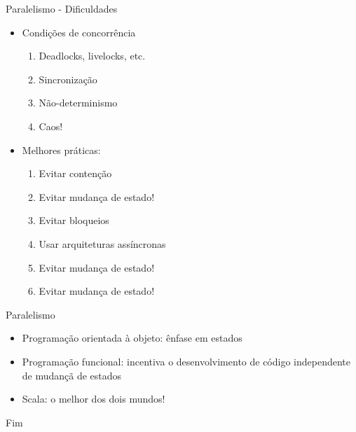 \documentclass[12pt]{beamer}
\begin{document}
\begin{frame}{Paralelismo - Dificuldades}
\begin{itemize}
\item Condições de concorrência
\pause
\begin{enumerate}
\item Deadlocks, livelocks, etc.
\pause
\item Sincronização
\pause
\item Não-determinismo
\pause
\item Caos!
\end{enumerate}
\pause
\item Melhores práticas:
\pause
\begin{enumerate}
\item Evitar contenção
\pause
\item Evitar mudança de estado!
\pause
\item Evitar bloqueios
\pause
\item Usar arquiteturas assíncronas
\pause
\item Evitar mudança de estado!
\pause
\item {\Huge \color{red} Evitar mudança de estado!}
\end{enumerate}
\end{itemize}
\end{frame}

\begin{frame}{Paralelismo}
\begin{itemize}
\item Programação orientada à objeto: ênfase em estados 
\pause
\item Programação funcional: incentiva o desenvolvimento 
      de código independente de mudançã de estados
\pause      
\item Scala: o melhor dos dois mundos!      
\end{itemize}
\end{frame}

\begin{frame}{Fim}
\end{frame}
\end{document}
